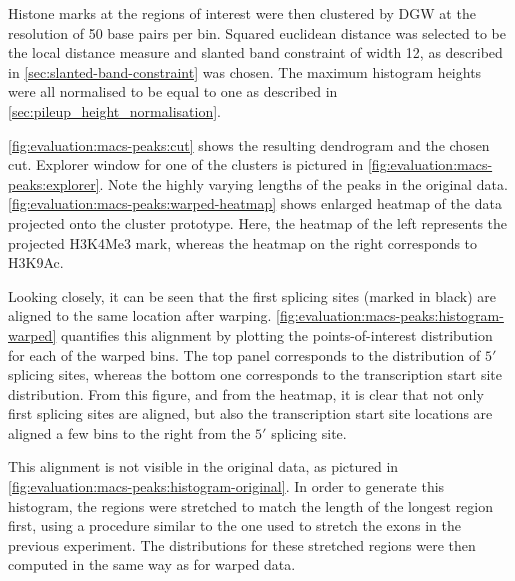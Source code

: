 \documentclass[parskip]{cs4rep}
\newcommand{\histonemodification}[1]{#1}
\begin{document}
Histone marks at the regions of interest were then clustered by DGW at the resolution of 50 base pairs per bin. Squared euclidean distance was selected to be the local distance measure and slanted band constraint of width 12, as described in \autoref{sec:slanted-band-constraint} was chosen. The maximum histogram heights were all normalised to be equal to one as described in \autoref{sec:pileup_height_normalisation}.

\autoref{fig:evaluation:macs-peaks:cut} shows the resulting dendrogram and the chosen cut. Explorer window for one of the clusters is pictured in \autoref{fig:evaluation:macs-peaks:explorer}. Note the highly varying lengths of the peaks in the original data. \autoref{fig:evaluation:macs-peaks:warped-heatmap} shows enlarged heatmap of the data projected onto the cluster prototype. Here, the heatmap of the left represents the projected \histonemodification{H3K4Me3} mark, whereas the heatmap on the right corresponds to \histonemodification{H3K9Ac}. 

Looking closely, it can be seen that the first splicing sites (marked in black) are aligned to the same location after warping. \autoref{fig:evaluation:macs-peaks:histogram-warped} quantifies this alignment by plotting the points-of-interest distribution for each of the warped bins. The top panel corresponds to the distribution of $5'$ splicing sites, whereas the bottom one corresponds to the transcription start site distribution. From this figure, and from the heatmap, it is clear that not only first splicing sites are aligned, but also the transcription start site locations are aligned a few bins to the right from the $5'$ splicing site.

This alignment is not visible in the original data, as pictured in \autoref{fig:evaluation:macs-peaks:histogram-original}. In order to generate this histogram, the regions were stretched to match the length of the longest region first, using a procedure similar to the one used to stretch the exons in the previous experiment. The distributions for these stretched regions were then computed in the same way as for warped data.
\end{document}
